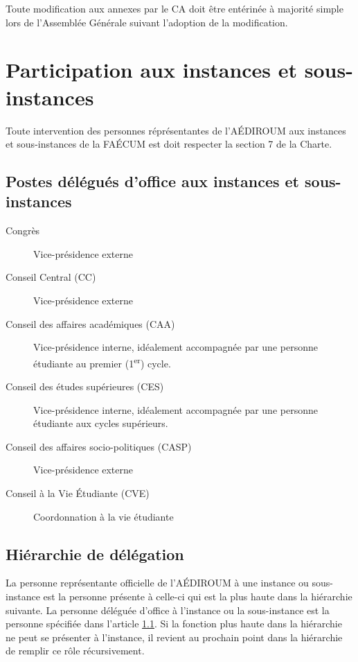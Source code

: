 \documentclass{aediroum}
\newcommand{\article}[1]{article \ref{#1}}
\begin{document}
Toute modification aux annexes par le CA doit être entérinée à majorité simple lors de l'Assemblée Générale suivant l'adoption de la modification.

\section{Participation aux instances et sous-instances}\label{sec:hierarchie-delegues-faecum}

Toute intervention des personnes réprésentantes de l'AÉDIROUM aux instances et sous-instances de la FAÉCUM est doit respecter la section 7 de la Charte.

\subsection{Postes délégués d'office aux instances et sous-instances}\label{sec:delegues-doffice-instances}
\begin{description}
\item[Congrès] Vice-présidence externe
\item[Conseil Central (CC)] Vice-présidence externe
\item[Conseil des affaires académiques (CAA)] Vice-présidence interne, idéalement accompagnée par une personne étudiante au premier (1\textsuperscript{er}) cycle.
\item[Conseil des études supérieures (CES)] Vice-présidence interne, idéalement accompagnée par une personne étudiante aux cycles supérieurs.
\item[Conseil des affaires socio-politiques (CASP)] Vice-présidence externe
\item[Conseil à la Vie Étudiante (CVE)] Coordonnation à la vie étudiante
\end{description}

\subsection{Hiérarchie de délégation}\label{sec:hierarchie-delegues-faecum}

La personne représentante officielle de l'AÉDIROUM à une instance ou sous-instance est la personne présente à celle-ci qui est la plus haute dans la hiérarchie suivante. La personne déléguée d'office à l'instance ou la sous-instance est la personne spécifiée dans l'\article{sec:delegues-doffice-instances}. Si la fonction plus haute dans la hiérarchie ne peut se présenter à l'instance, il revient au prochain point dans la hiérarchie de remplir ce rôle récursivement.
\end{document}
